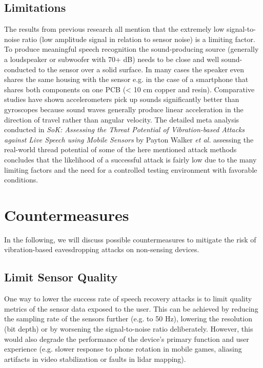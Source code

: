 \documentclass[sigconf, nonacm]{acmart}
\begin{document}
\subsection{Limitations}
The results from previous research all mention that the extremely low signal-to-noise ratio (low amplitude signal in relation to sensor noise) is a limiting factor.
To produce meaningful speech recognition the sound-producing source (generally a loudspeaker or subwoofer with 70+ dB) needs to be close and well sound-conducted to the sensor over a solid surface.
In many cases the speaker even shares the same housing with the sensor e.g. in the case of a smartphone that shares both components on one PCB (< 10 cm copper and resin).
Comparative studies have shown accelerometers pick up sounds significantly better than gyroscopes \cite{AccelEve2020} because sound waves generally produce linear acceleration in the direction of travel rather than angular velocity.
The detailed meta analysis conducted in \textit{SoK: Assessing the Threat Potential of Vibration-based Attacks against Live Speech using Mobile Sensors} \cite{SokVibration2021} by Payton Walker \textit{et al.} assessing the real-world thread potential of some of the here mentioned attack methods concludes that the likelihood of a successful attack is fairly low due to the many limiting factors and the need for a controlled testing environment with favorable conditions.

\section{Countermeasures}
In the following, we will discuss possible countermeasures to mitigate the risk of vibration-based eavesdropping attacks on non-sensing devices.

\subsection{Limit Sensor Quality}
One way to lower the success rate of speech recovery attacks is to limit quality metrics of the sensor data exposed to the user.
This can be achieved by reducing the sampling rate of the sensors further (e.g. to 50 Hz), lowering the resolution (bit depth) or by worsening the signal-to-noise ratio deliberately.
However, this would also degrade the performance of the device's primary function and user experience (e.g. slower response to phone rotation in mobile games, aliasing artifacts in video stabilization or faults in lidar mapping).
\end{document}

